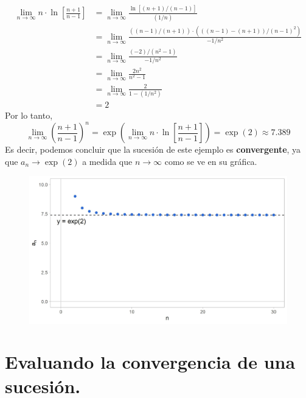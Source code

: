 \documentclass[12pt]{article}
\begin{document}
\begin{align*}
\lim_{n \to \infty} n \cdot \ln\left[\frac{n + 1}{n - 1}\right] &= \lim_{n \to \infty} \frac{\ln[(n + 1)/(n - 1)]}{(1/n)} \\
                                                                &= \lim_{n \to \infty} \frac{((n - 1)/(n + 1)) \cdot (((n - 1) - (n + 1))/(n - 1)^{2})}{-1/n^{2}} \\
                                                                &= \lim_{n \to \infty} \frac{(-2)/(n^{2} - 1)}{-1/n^{2}} \\
                                                                &= \lim_{n \to \infty} \frac{2n^{2}}{n^{2} - 1} \\
                                                                &= \lim_{n \to \infty} \frac{2}{1 - (1/n^{2})} \\
                                                                &= 2
\end{align*}
Por lo tanto,
\[
  \lim_{n \to \infty} \left(\frac{n + 1}{n - 1}\right)^{n} = \exp\left(\lim_{n \to \infty} n \cdot \ln\left[\frac{n + 1}{n - 1}\right]\right)
                                                           = \exp(2)
                                                           \approx 7.389
\]
Es decir, podemos concluir que la sucesión de este ejemplo es \textbf{convergente}, ya que $a_{n} \to \exp(2)$ a medida que $n \to \infty$ como se ve en su gráfica.

\begin{figure}[hbt!]
\centering
\includegraphics[scale=0.7]{limit-lhopital-example.jpg}
\end{figure}


\section{Evaluando la convergencia de una sucesión.}
\end{document}
